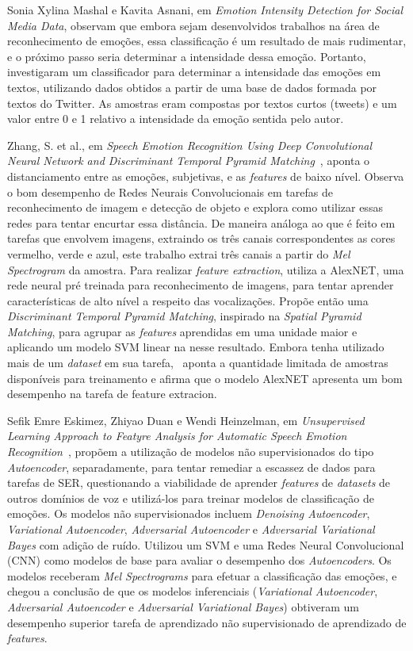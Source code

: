 Sonia Xylina Mashal e Kavita Asnani, em \textit{Emotion Intensity Detection for Social Media Data}\cite{14}, observam que embora sejam desenvolvidos trabalhos na área de reconhecimento de emoções, essa classificação é um resultado de mais rudimentar, e o próximo passo seria determinar a intensidade dessa emoção. Portanto, investigaram um classificador para determinar a intensidade das emoções em textos, utilizando dados obtidos a partir de uma base de dados formada por textos do Twitter. As amostras eram compostas por textos curtos (tweets) e um valor entre 0 e 1 relativo a intensidade da emoção sentida pelo autor.

Zhang, S. et al., em \textit{Speech Emotion Recognition Using Deep Convolutional Neural Network and Discriminant Temporal Pyramid Matching}~\cite{32.25}, aponta o distanciamento entre as emoções, subjetivas, e as \textit{features} de baixo nível. Observa o bom desempenho de Redes Neurais Convolucionais em tarefas de reconhecimento de imagem e detecção de objeto e explora como utilizar essas redes para tentar encurtar essa distância. De maneira análoga ao que é feito em tarefas que envolvem imagens, extraindo os três canais correspondentes as cores vermelho, verde e azul, este trabalho extrai três canais a partir do \textit{Mel Spectrogram} da amostra. Para realizar \textit{feature extraction}, utiliza a AlexNET, uma rede neural pré treinada para reconhecimento de imagens, para tentar aprender características de alto nível a respeito das vocalizações. Propõe então uma \textit{Discriminant Temporal Pyramid Matching}, inspirado na \textit{Spatial Pyramid Matching}, para agrupar as \textit{features} aprendidas em uma unidade maior e aplicando um modelo \acrshort{SVM} linear na nesse resultado. Embora tenha utilizado mais de um \textit{dataset} em sua tarefa,~\cite{32.25} aponta a quantidade limitada de amostras disponíveis para treinamento e afirma que o modelo AlexNET apresenta um bom desempenho na tarefa de feature extracion.

Sefik Emre Eskimez, Zhiyao Duan e Wendi Heinzelman, em \textit{Unsupervised Learning Approach to Featyre Analysis for Automatic Speech Emotion Recognition}~\cite{34}, propõem a utilização de modelos não supervisionados do tipo \textit{Autoencoder}, separadamente, para tentar remediar a escassez de dados para tarefas de \acrshort{SER}, questionando a viabilidade de aprender \textit{features} de \textit{datasets} de outros domínios de voz e utilizá-los para treinar modelos de classificação de emoções. Os modelos não supervisionados incluem \textit{Denoising Autoencoder}, \textit{Variational Autoencoder}, \textit{Adversarial Autoencoder} e \textit{Adversarial Variational Bayes} com adição de ruído. Utilizou um \acrshort{SVM} e uma Redes Neural Convolucional (\acrshort{CNN}) como modelos de base para avaliar o desempenho dos \textit{Autoencoders}. Os modelos receberam \textit{Mel Spectrograms} para efetuar a classificação das emoções, e~\cite{34} chegou a conclusão de que os modelos inferenciais (\textit{Variational Autoencoder}, \textit{Adversarial Autoencoder} e \textit{Adversarial Variational Bayes}) obtiveram um desempenho superior tarefa de aprendizado não supervisionado de aprendizado de \textit{features}.

